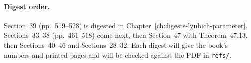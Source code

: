 \paragraph{Digest order.}
Section~39 (pp.~519--528) is digested in Chapter~\ref{ch:digests-lyubich-parameter}.  Sections~33--38 (pp.~461--518)
come next, then Section~47 with Theorem~47.13, then Sections~40--46 and
Sections~28--32.  Each digest will give the book's numbers and printed pages and will be checked against the
PDF in \texttt{refs/}.

